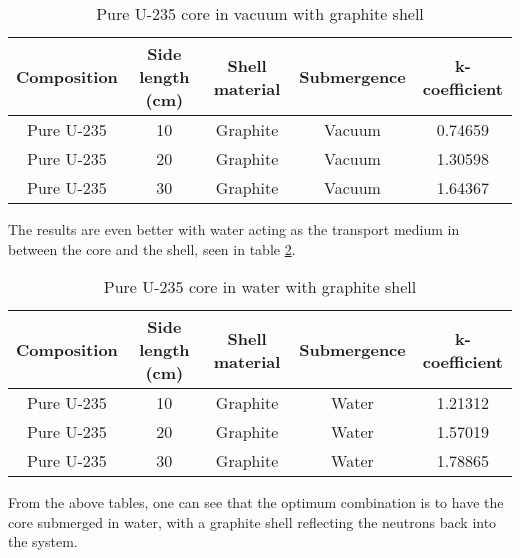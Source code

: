 \begin{table}[!htbp]
\centering
\caption{Pure U-235 core in vacuum with graphite shell}
\label{tab:puregraphite}
\begin{tabular}{|c|c|c|c|c|}
\hline
Composition & Side length (cm) & Shell material & Submergence & k-coefficient \\
\hline
Pure U-235  & 10               & Graphite            & Vacuum       & 0.74659      \\
\hline
Pure U-235  & 20               & Graphite            & Vacuum       & 1.30598       \\
\hline
Pure U-235  & 30               & Graphite            & Vacuum       & 1.64367       \\
\hline
\end{tabular}
\end{table}
The results are even better with water acting as the transport medium in between the core and the shell, seen in table \ref{tab:puregraphitew}.
\begin{table}[!htbp]
\centering
\caption{Pure U-235 core in water with graphite shell}
\label{tab:puregraphitew}
\begin{tabular}{|c|c|c|c|c|}
\hline
Composition & Side length (cm) & Shell material & Submergence & k-coefficient \\
\hline
Pure U-235  & 10               & Graphite            & Water       & 1.21312      \\
\hline
Pure U-235  & 20               & Graphite            & Water       & 1.57019       \\
\hline
Pure U-235  & 30               & Graphite            & Water       & 1.78865       \\
\hline
\end{tabular}
\end{table}
From the above tables, one can see that the optimum combination is to have the core submerged in water, with a graphite shell reflecting the neutrons back into the system.

